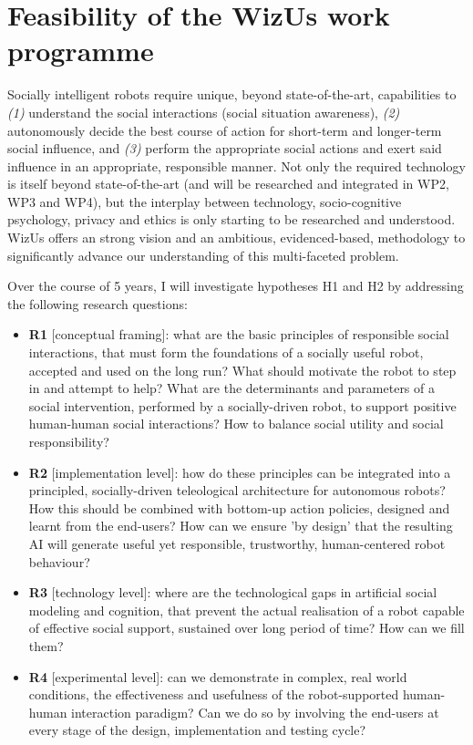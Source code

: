 \documentclass[11pt,a4paper]{report}
\newcommand{\project}{WizUs\xspace}
\begin{document}
\section{Feasibility of the \project work programme}

Socially intelligent robots require unique, beyond state-of-the-art,
capabilities to \emph{(1)} understand the social interactions (social
situation awareness), \emph{(2)} autonomously decide the best course of action for
short-term and longer-term social influence, and \emph{(3)} perform the
appropriate social actions and exert said influence in an appropriate,
responsible manner.
Not only the required technology is itself beyond state-of-the-art (and will be
researched and integrated in WP2, WP3 and WP4), but the
interplay between technology, socio-cognitive psychology, privacy and ethics is
only starting to be researched and understood. \project offers an
strong vision and an ambitious, evidenced-based, methodology to significantly
advance our understanding of this multi-faceted problem.

Over the course of 5 years, I will investigate hypotheses H1 and H2
by addressing the following research questions:

\begin{itemize}
    \item \textbf{R1} [conceptual framing]: what are the basic principles of
        responsible social interactions, that must form the foundations of a
        socially useful robot, accepted and used on the long run? What should
        motivate the robot to step in and attempt to help? What are the
        determinants and parameters of a social intervention, performed by a
        socially-driven robot, to support positive human-human social
        interactions? How to balance social utility and social responsibility?

    \item \textbf{R2} [implementation level]: how do these principles
        can be integrated into a principled, socially-driven teleological
        architecture for autonomous robots? How this should be combined with
        bottom-up action policies, designed and learnt from the end-users? How
        can we ensure 'by design' that the resulting AI will generate useful yet
        responsible, trustworthy, human-centered robot behaviour?

    \item \textbf{R3} [technology level]: where are the technological gaps in
        artificial social modeling and cognition, that prevent the actual
        realisation of a robot capable of effective social support, sustained
        over long period of time? How can we fill them?

    \item \textbf{R4} [experimental level]: can we demonstrate in complex, real
        world conditions, the effectiveness and usefulness of the
        robot-supported human-human interaction paradigm? Can we do so by
        involving the end-users at every stage of the design, implementation and
        testing cycle?

\end{itemize}
\end{document}
